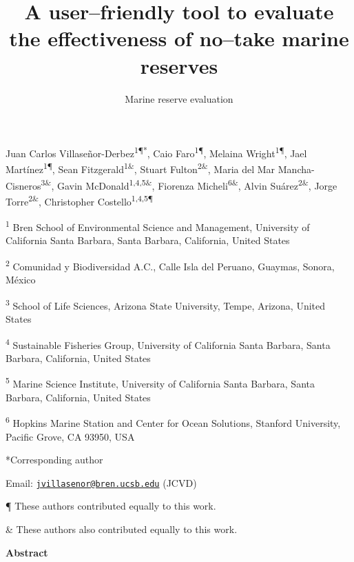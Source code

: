 \documentclass[12pt,]{article}
\title{A user--friendly tool to evaluate the effectiveness of no--take marine
reserves}
\subtitle{Marine reserve evaluation}
\author{}
\date{}
\begin{document}
\maketitle

Juan Carlos Villaseñor-Derbez\textsuperscript{1¶*}, Caio
Faro\textsuperscript{1¶}, Melaina Wright\textsuperscript{1¶}, Jael
Martínez\textsuperscript{1¶}, Sean Fitzgerald\textsuperscript{1\&},
Stuart Fulton\textsuperscript{2\&}, Maria del Mar
Mancha-Cisneros\textsuperscript{3\&}, Gavin
McDonald\textsuperscript{1,4,5\&}, Fiorenza
Micheli\textsuperscript{6\&}, Alvin Suárez\textsuperscript{2\&}, Jorge
Torre\textsuperscript{2\&}, Christopher Costello\textsuperscript{1,4,5¶}

\textsuperscript{1} Bren School of Environmental Science and Management,
University of California Santa Barbara, Santa Barbara, California,
United States

\textsuperscript{2} Comunidad y Biodiversidad A.C., Calle Isla del
Peruano, Guaymas, Sonora, México

\textsuperscript{3} School of Life Sciences, Arizona State University,
Tempe, Arizona, United States

\textsuperscript{4} Sustainable Fisheries Group, University of
California Santa Barbara, Santa Barbara, California, United States

\textsuperscript{5} Marine Science Institute, University of California
Santa Barbara, Santa Barbara, California, United States

\textsuperscript{6} Hopkins Marine Station and Center for Ocean
Solutions, Stanford University, Pacific Grove, CA 93950, USA

*Corresponding author

Email:
\href{mailto:jvillasenor@bren.ucsb.edu}{\nolinkurl{jvillasenor@bren.ucsb.edu}}
(JCVD)

¶ These authors contributed equally to this work.

\& These authors also contributed equally to this work.

\clearpage

\textbf{Abstract}
\end{document}
